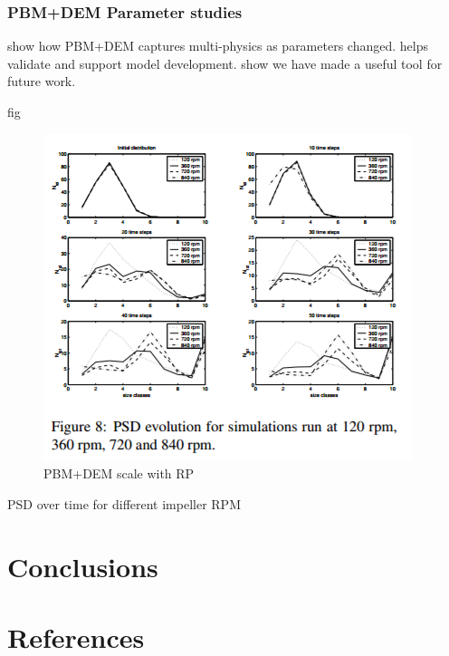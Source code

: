 \documentclass[preprint,11pt,authoryear]{elsarticle}
\begin{document}
	   \subsubsection{PBM+DEM Parameter studies}
	   \par show how PBM+DEM captures multi-physics as parameters changed. helps validate and support model development. show we have made a useful tool for future work.
	   \par fig 
	      \begin{figure}[H]
	      \centering
	      \includegraphics[scale=0.7]{rslts_psd_evo_time}
	      \caption{PBM+DEM scale with RP}
	      \label{fig:rslts_psd_evo_time}
	      \end{figure}
	   \par PSD over time for different impeller RPM
	    
	\section{Conclusions}
	
	\section*{References} 
	
	
	
\end{document}
